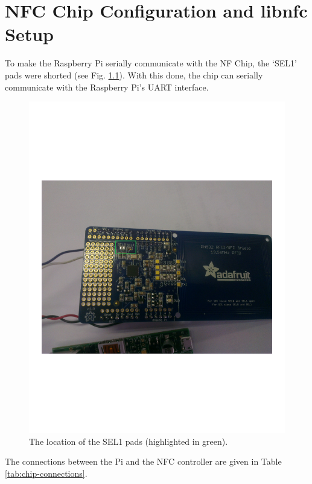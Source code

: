 \chapter{NFC Chip Configuration and libnfc Setup}
\label{app:nfc-chip-config}

To make the Raspberry Pi serially communicate with the NF Chip, the `SEL1'
pads were shorted (see Fig.
\ref{fig:nfc-chip-solder}). With this done, the chip can serially communicate
with the Raspberry Pi's UART interface.

\begin{figure}
 \centering 
 \includegraphics[clip=true, trim = 0 250 0 290,
 scale=0.7]{soldeer_pic}
 \caption[The location of the SEL1 pads.]{The location of the SEL1 pads (highlighted in
 green).}
 \label{fig:nfc-chip-solder}
\end{figure}

The connections between the Pi and the NFC controller are given in Table
\ref{tab:chip-connections}.


